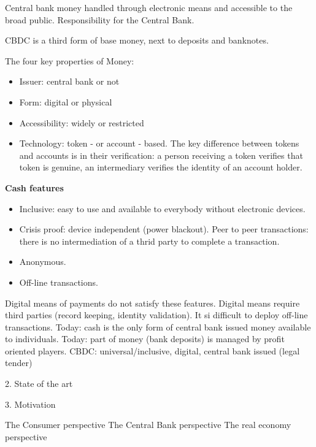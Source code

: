 Central bank money handled through electronic means and accessible to the broad public. Responsibility for the Central Bank.

CBDC is a third form of base money, next to deposits and banknotes.

The four key properties of Money:
\begin{itemize}
	\item Issuer: central bank or not
	\item Form: digital or physical
	\item Accessibility: widely or restricted
	\item Technology: token - or account - based. The key difference between tokens and accounts is in their verification: a person receiving a token verifies that token is genuine, an intermediary verifies the identity of an account holder.
\end{itemize}


\textbf{Cash features}
\begin{itemize}
	\item Inclusive: easy to use and available to everybody without electronic devices.
	\item Crisis proof: device independent (power blackout).
	Peer to peer transactions: there is no intermediation of a thrid party to complete a transaction.
	\item Anonymous.
	\item Off-line transactions.
\end{itemize}

Digital means of payments do not satisfy these features. Digital means require third parties (record keeping, identity validation). It si difficult to deploy off-line transactions.
Today: cash is the only form of central bank issued money available to individuals.
Today: part of money (bank deposits) is managed by profit oriented players.
CBDC: universal/inclusive, digital, central bank issued (legal tender)



2. State of the art

3. Motivation

The Consumer perspective
The Central Bank perspective
The real economy perspective

